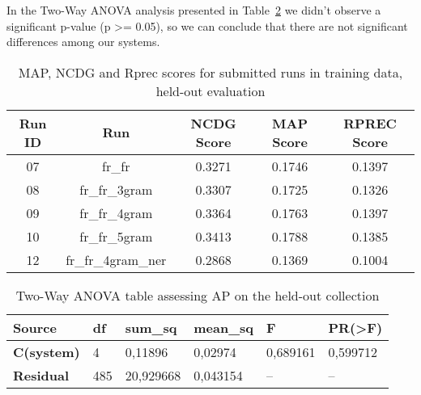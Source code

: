 In the Two-Way ANOVA analysis presented in Table~\ref{tab:ho_anova} we didn't observe a significant p-value (p >= 0.05),
so we can conclude that there are not significant differences among our systems.

\begin{table}[h!]
    \begin{center}
        \caption{MAP, NCDG and Rprec scores for submitted runs in training data, held-out evaluation}
        \label{tab:ho_scores}
        \begin{tabular}{|c|c||c|c|c|}
            \hline
            \textbf{Run ID} & \textbf{Run} & \textbf{NCDG Score} & \textbf{MAP Score} & \textbf{RPREC Score}\\
            \hline\hline
            07 & fr\_fr & 0.3271 & 0.1746 & 0.1397 \\
            \hline
            08 & fr\_fr\_3gram & 0.3307 & 0.1725 & 0.1326 \\
            \hline
            09 & fr\_fr\_4gram & 0.3364 & 0.1763 & 0.1397 \\
            \hline
            10 & fr\_fr\_5gram & 0.3413 & 0.1788 & 0.1385 \\
            \hline
            12 & fr\_fr\_4gram\_ner & 0.2868 & 0.1369 & 0.1004 \\
            \hline
        \end{tabular}
    \end{center}
\end{table}

\begin{table}[h!]
    \centering
    \caption{Two-Way ANOVA table assessing AP on the held-out collection}
    \label{tab:ho_anova}
    \begin{tabular}{|l|l|l|l|l|l|}
    \hline
        \textbf{Source} & \textbf{df} & \textbf{sum\_sq} & \textbf{mean\_sq} & \textbf{F} & \textbf{PR(>F)} \\ \hline\hline
        \textbf{C(system)} & 4 & 0,11896 & 0,02974 & 0,689161 & 0,599712 \\ \hline
        \textbf{Residual} & 485 & 20,929668 & 0,043154 & -- & -- \\ \hline
    \end{tabular}
\end{table}

